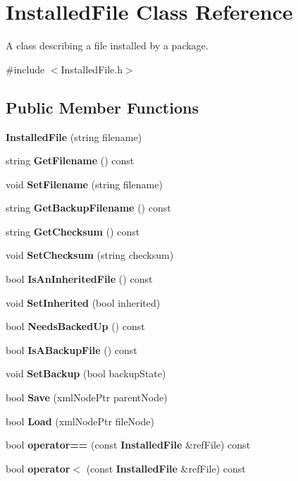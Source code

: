 \section{InstalledFile Class Reference}
\label{classInstalledFile}


A class describing a file installed by a package.  




{\ttfamily \#include $<$InstalledFile.h$>$}

\subsection*{Public Member Functions}
\begin{DoxyCompactItemize}
\item 
{\bf InstalledFile} (string filename)
\item 
string {\bf GetFilename} () const 
\item 
void {\bf SetFilename} (string filename)
\item 
string {\bf GetBackupFilename} () const 
\item 
string {\bf GetChecksum} () const 
\item 
void {\bf SetChecksum} (string checksum)
\item 
bool {\bf IsAnInheritedFile} () const 
\item 
void {\bf SetInherited} (bool inherited)
\item 
bool {\bf NeedsBackedUp} () const 
\item 
bool {\bf IsABackupFile} () const 
\item 
void {\bf SetBackup} (bool backupState)
\item 
bool {\bf Save} (xmlNodePtr parentNode)
\item 
bool {\bf Load} (xmlNodePtr fileNode)
\item 
bool {\bf operator==} (const {\bf InstalledFile} \&refFile) const 
\item 
bool {\bf operator$<$} (const {\bf InstalledFile} \&refFile) const 
\end{DoxyCompactItemize}
